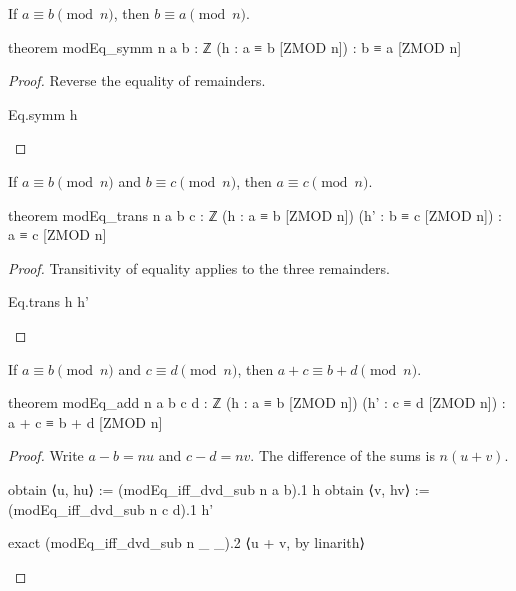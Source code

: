 \begin{theorem}
  \label{ent:thm:modeq-symm}
  If $a\equiv b\pmod n$, then $b\equiv a\pmod n$.

  \begin{lean}
    theorem modEq_symm {n a b : ℤ} (h : a ≡ b [ZMOD n]) : b ≡ a [ZMOD n]
  \end{lean}
\end{theorem}

\begin{proof}
  Reverse the equality of remainders.

  \begin{lean}
    Eq.symm h
  \end{lean}
\end{proof}

\begin{theorem}
  \label{ent:thm:modeq-trans}
  If $a\equiv b\pmod n$ and $b\equiv c\pmod n$, then $a\equiv c\pmod n$.

  \begin{lean}
    theorem modEq_trans {n a b c : ℤ} (h : a ≡ b [ZMOD n]) (h' : b ≡ c [ZMOD n]) :
        a ≡ c [ZMOD n]
  \end{lean}
\end{theorem}

\begin{proof}
  Transitivity of equality applies to the three remainders.

  \begin{lean}
    Eq.trans h h'
  \end{lean}
\end{proof}

\begin{theorem}
  \label{ent:thm:modeq-add}
  If $a\equiv b\pmod n$ and $c\equiv d\pmod n$, then $a+c\equiv b+d\pmod n$.

  \begin{lean}
    theorem modEq_add {n a b c d : ℤ} (h : a ≡ b [ZMOD n]) (h' : c ≡ d [ZMOD n]) :
        a + c ≡ b + d [ZMOD n]
  \end{lean}
\end{theorem}

\begin{proof}
  Write $a-b=nu$ and $c-d=nv$.
  The difference of the sums is $n(u+v)$.

  \begin{lean}
    obtain ⟨u, hu⟩ := (modEq_iff_dvd_sub n a b).1 h
    obtain ⟨v, hv⟩ := (modEq_iff_dvd_sub n c d).1 h'

    exact (modEq_iff_dvd_sub n _ _).2 ⟨u + v, by linarith⟩
  \end{lean}
\end{proof}

